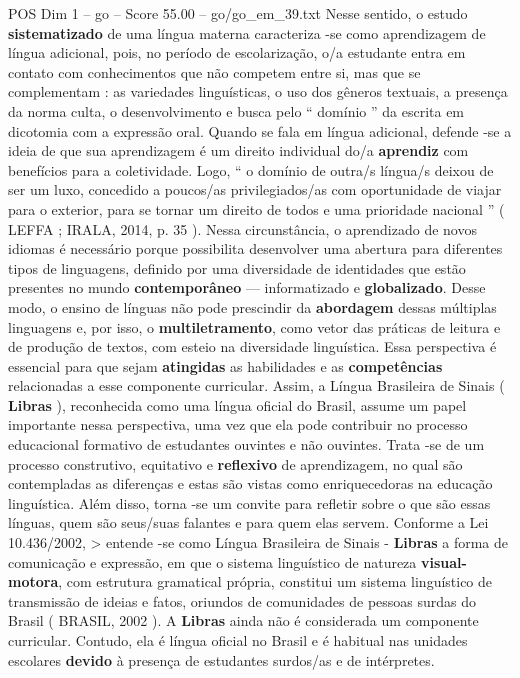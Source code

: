 \begin{textsample}{POS Dim 1 – go – Score 55.00 – go/go\_em\_39.txt}
Nesse sentido, o estudo \textbf{sistematizado} de uma língua materna caracteriza -se como aprendizagem de língua adicional, pois, no período de escolarização, o/a estudante entra em contato com conhecimentos que não competem entre si, mas que se complementam : as variedades linguísticas, o uso dos gêneros textuais, a presença da norma culta, o desenvolvimento e busca pelo “ domínio ” da escrita em dicotomia com a expressão oral.
Quando se fala em língua adicional, defende -se a ideia de que sua aprendizagem é um direito individual do/a \textbf{aprendiz} com benefícios para a coletividade.
Logo, “ o domínio de outra/s língua/s deixou de ser um luxo, concedido a poucos/as privilegiados/as com oportunidade de viajar para o exterior, para se tornar um direito de todos e uma prioridade nacional ” ( LEFFA ; IRALA, 2014, p. 35 ).
Nessa circunstância, o aprendizado de novos idiomas é necessário porque possibilita desenvolver uma abertura para diferentes tipos de linguagens, definido por uma diversidade de identidades que estão presentes no mundo \textbf{contemporâneo} — informatizado e \textbf{globalizado}.
Desse modo, o ensino de línguas não pode prescindir da \textbf{abordagem} dessas múltiplas linguagens e, por isso, o \textbf{multiletramento}, como vetor das práticas de leitura e de produção de textos, com esteio na diversidade linguística.
Essa perspectiva é essencial para que sejam \textbf{atingidas} as habilidades e as \textbf{competências} relacionadas a esse componente curricular.
Assim, a Língua Brasileira de Sinais ( \textbf{Libras} ), reconhecida como uma língua oficial do Brasil, assume um papel importante nessa perspectiva, uma vez que ela pode contribuir no processo educacional formativo de estudantes ouvintes e não ouvintes.
Trata -se de um processo construtivo, equitativo e \textbf{reflexivo} de aprendizagem, no qual são contempladas as diferenças e estas são vistas como enriquecedoras na educação linguística.
Além disso, torna -se um convite para refletir sobre o que são essas línguas, quem são seus/suas falantes e para quem elas servem.
Conforme a Lei 10.436/2002, > entende -se como Língua Brasileira de Sinais - \textbf{Libras} a forma de comunicação e expressão, em que o sistema linguístico de natureza \textbf{visual-motora}, com estrutura gramatical própria, constitui um sistema linguístico de transmissão de ideias e fatos, oriundos de comunidades de pessoas surdas do Brasil ( BRASIL, 2002 ).
A \textbf{Libras} ainda não é considerada um componente curricular.
Contudo, ela é língua oficial no Brasil e é habitual nas unidades escolares \textbf{devido} à presença de estudantes surdos/as e de intérpretes.

\end{textsample}
